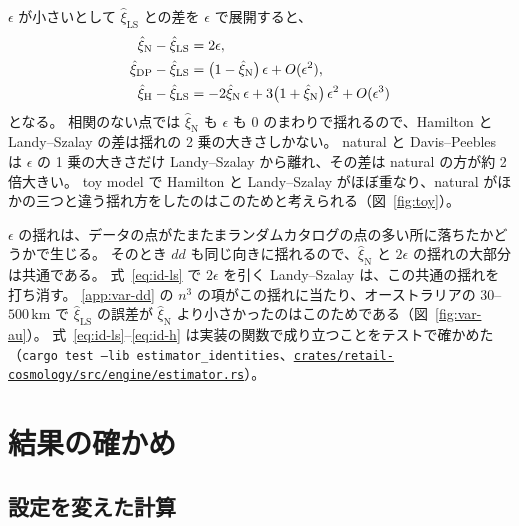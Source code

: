 \documentclass[a4paper,11pt]{ltjsarticle}
\newcommand{\repourl}{https://github.com/inuverse44/retail-cosmology}
\newcommand{\code}[1]{\textcolor{codecolor}{\texttt{#1}}}
\begin{document}
$\epsilon$ が小さいとして $\hat\xi_{\mathrm{LS}}$ との差を $\epsilon$ で展開すると、
\begin{align}
  \hat\xi_{\mathrm{N}}  - \hat\xi_{\mathrm{LS}} &= 2\epsilon, \notag \\
  \hat\xi_{\mathrm{DP}} - \hat\xi_{\mathrm{LS}} &= \bigl(1 - \hat\xi_{\mathrm{N}}\bigr)\, \epsilon + O(\epsilon^2), \label{eq:id-expand} \\
  \hat\xi_{\mathrm{H}}  - \hat\xi_{\mathrm{LS}} &= -2\hat\xi_{\mathrm{N}}\, \epsilon + 3\bigl(1 + \hat\xi_{\mathrm{N}}\bigr)\, \epsilon^2 + O(\epsilon^3) \notag
\end{align}
となる。
相関のない点では $\hat\xi_{\mathrm{N}}$ も $\epsilon$ も $0$ のまわりで揺れるので、Hamilton と Landy--Szalay の差は揺れの 2 乗の大きさしかない。
natural と Davis--Peebles は $\epsilon$ の 1 乗の大きさだけ Landy--Szalay から離れ、その差は natural の方が約 2 倍大きい。
toy model で Hamilton と Landy--Szalay がほぼ重なり、natural がほかの三つと違う揺れ方をしたのはこのためと考えられる（図~\ref{fig:toy}）。

$\epsilon$ の揺れは、データの点がたまたまランダムカタログの点の多い所に落ちたかどうかで生じる。
そのとき $dd$ も同じ向きに揺れるので、$\hat\xi_{\mathrm{N}}$ と $2\epsilon$ の揺れの大部分は共通である。
式~\eqref{eq:id-ls} で $2\epsilon$ を引く Landy--Szalay は、この共通の揺れを打ち消す。
\ref{app:var-dd} の $n^3$ の項がこの揺れに当たり、オーストラリアの $30$--$500\,\mathrm{km}$ で $\hat\xi_{\mathrm{LS}}$ の誤差が $\hat\xi_{\mathrm{N}}$ より小さかったのはこのためである（図~\ref{fig:var-au}）。
式~\eqref{eq:id-ls}--\eqref{eq:id-h} は実装の関数で成り立つことをテストで確かめた（\code{cargo test --lib estimator\_identities}、\href{\repourl/blob/main/crates/retail-cosmology/src/engine/estimator.rs}{\nolinkurl{crates/retail-cosmology/src/engine/estimator.rs}}）。

\section{結果の確かめ}
\label{app:checks}

\subsection{設定を変えた計算}
\label{app:robust}
\end{document}
